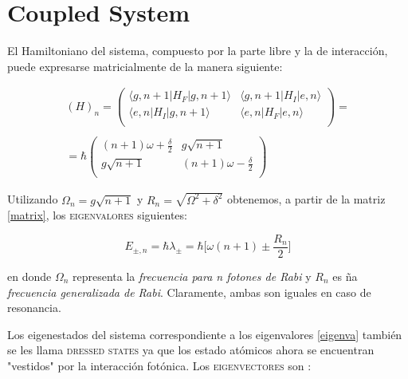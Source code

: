 \documentclass[spanish]{article}
\begin{document}
\section{Coupled System}

El Hamiltoniano del sistema, compuesto por la parte libre y la de interacción, puede expresarse matricialmente de la manera siguiente: 

\begin{equation}
\begin{split}
(H)_n =
\begin{pmatrix}
	\langle g, n+1 |H_F| g,n+1\rangle & \langle g, n+1|H_I|e,n\rangle\\
	\langle e,n|H_I|g, n+1\rangle & \langle e,n|H_F|e,n\rangle\\
\end{pmatrix} = \\
\\
= \hbar\begin{pmatrix}
	(n+1)\omega + \frac{\delta}{2} & g\sqrt{n+1}\\
	g\sqrt{n+1}& (n+1)\omega - \frac{\delta}{2}\\
\end{pmatrix} 
\end{split}
\label{matrix}
\end{equation}

Utilizando $\Omega_n = g\sqrt{n+1}$ y $R_n = \sqrt{\Omega^2+\delta^2}$ obtenemos, a partir de la matriz \ref{matrix}, los \textsc{eigenvalores} siguientes:

\begin{equation}
E_{\pm,n} = \hbar \lambda_{\pm} = \hbar \bigg[\omega(n+1) \pm \frac{R_n}{2}\bigg]
\label{eigenva}
\end{equation}

en donde $\Omega_n$ representa la \textit{frecuencia para n fotones de Rabi} y $R_n$ es ña \textit{frecuencia generalizada de Rabi}. Claramente, ambas son iguales en caso de resonancia. 

Los eigenestados del sistema correspondiente a los eigenvalores \ref{eigenva} también se les llama \textsc{dressed states} ya que los estado atómicos ahora se encuentran "vestidos" por la interacción fotónica. Los \textsc{eigenvectores} son : 
\end{document}
